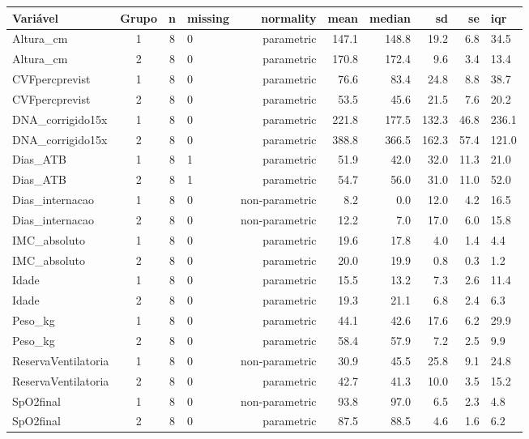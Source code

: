 \documentclass[
]{article}
\begin{document}
\begin{tabular}{l|c|c|l|r|r|r|r|r|l}
\hline
Variável & Grupo & n & missing & normality & mean & median & sd & se & iqr\\
\hline
Altura\_cm & 1 & 8 & 0 & parametric & 147.1 & 148.8 & 19.2 & 6.8 & 34.5\\
\hline
Altura\_cm & 2 & 8 & 0 & parametric & 170.8 & 172.4 & 9.6 & 3.4 & 13.4\\
\hline
CVFpercprevist & 1 & 8 & 0 & parametric & 76.6 & 83.4 & 24.8 & 8.8 & 38.7\\
\hline
CVFpercprevist & 2 & 8 & 0 & parametric & 53.5 & 45.6 & 21.5 & 7.6 & 20.2\\
\hline
DNA\_corrigido15x & 1 & 8 & 0 & parametric & 221.8 & 177.5 & 132.3 & 46.8 & 236.1\\
\hline
DNA\_corrigido15x & 2 & 8 & 0 & parametric & 388.8 & 366.5 & 162.3 & 57.4 & 121.0\\
\hline
Dias\_ATB & 1 & 8 & 1 & parametric & 51.9 & 42.0 & 32.0 & 11.3 & 21.0\\
\hline
Dias\_ATB & 2 & 8 & 1 & parametric & 54.7 & 56.0 & 31.0 & 11.0 & 52.0\\
\hline
Dias\_internacao & 1 & 8 & 0 & non-parametric & 8.2 & 0.0 & 12.0 & 4.2 & 16.5\\
\hline
Dias\_internacao & 2 & 8 & 0 & non-parametric & 12.2 & 7.0 & 17.0 & 6.0 & 15.8\\
\hline
IMC\_absoluto & 1 & 8 & 0 & parametric & 19.6 & 17.8 & 4.0 & 1.4 & 4.4\\
\hline
IMC\_absoluto & 2 & 8 & 0 & parametric & 20.0 & 19.9 & 0.8 & 0.3 & 1.2\\
\hline
Idade & 1 & 8 & 0 & parametric & 15.5 & 13.2 & 7.3 & 2.6 & 11.4\\
\hline
Idade & 2 & 8 & 0 & parametric & 19.3 & 21.1 & 6.8 & 2.4 & 6.3\\
\hline
Peso\_kg & 1 & 8 & 0 & parametric & 44.1 & 42.6 & 17.6 & 6.2 & 29.9\\
\hline
Peso\_kg & 2 & 8 & 0 & parametric & 58.4 & 57.9 & 7.2 & 2.5 & 9.9\\
\hline
ReservaVentilatoria & 1 & 8 & 0 & non-parametric & 30.9 & 45.5 & 25.8 & 9.1 & 24.8\\
\hline
ReservaVentilatoria & 2 & 8 & 0 & parametric & 42.7 & 41.3 & 10.0 & 3.5 & 15.2\\
\hline
SpO2final & 1 & 8 & 0 & non-parametric & 93.8 & 97.0 & 6.5 & 2.3 & 4.8\\
\hline
SpO2final & 2 & 8 & 0 & parametric & 87.5 & 88.5 & 4.6 & 1.6 & 6.2\\

\end{tabular}
\end{document}
